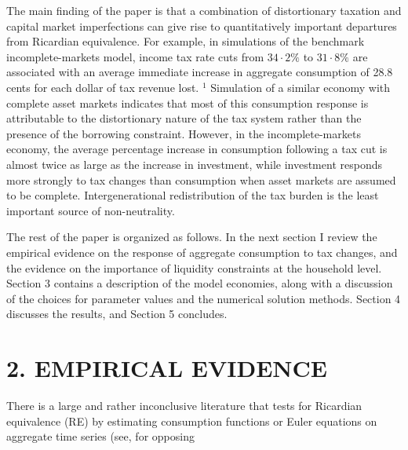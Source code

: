 \documentclass[11pt]{article}
\begin{document}
The main finding of the paper is that a combination of distortionary taxation and capital market imperfections can give rise to quantitatively important departures from Ricardian equivalence. For example, in simulations of the benchmark incomplete-markets model, income tax rate cuts from $34 \cdot 2 \%$ to $31 \cdot 8 \%$ are associated with an average immediate increase in aggregate consumption of 28.8 cents for each dollar of tax revenue lost. ${ }^{1}$ Simulation of a similar economy with complete asset markets indicates that most of this consumption response is attributable to the distortionary nature of the tax system rather than the presence of the borrowing constraint. However, in the incomplete-markets economy, the average percentage increase in consumption following a tax cut is almost twice as large as the increase in investment, while investment responds more strongly to tax changes than consumption when asset markets are assumed to be complete. Intergenerational redistribution of the tax burden is the least important source of non-neutrality.

The rest of the paper is organized as follows. In the next section I review the empirical evidence on the response of aggregate consumption to tax changes, and the evidence on the importance of liquidity constraints at the household level. Section 3 contains a description of the model economies, along with a discussion of the choices for parameter values and the numerical solution methods. Section 4 discusses the results, and Section 5 concludes.

\section*{2. EMPIRICAL EVIDENCE}
There is a large and rather inconclusive literature that tests for Ricardian equivalence (RE) by estimating consumption functions or Euler equations on aggregate time series (see, for opposing
\end{document}
